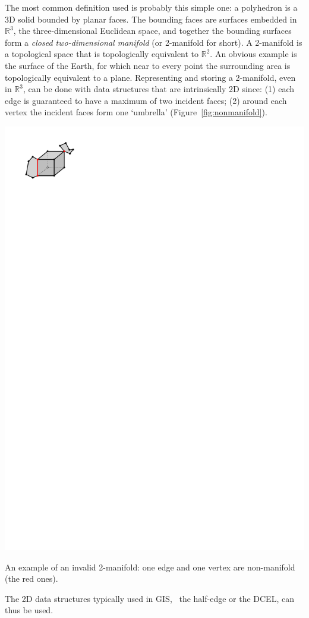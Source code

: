 %

The most common definition used is probably this simple one: a polyhedron is a 3D solid bounded by planar faces. 
The bounding faces are surfaces embedded in $\mathbb{R}^3$, the three-dimen\-si\-o\-nal Euclidean space, and together the bounding surfaces form a \emph{closed two-dimensional manifold} (or 2-manifold for short).
A 2-manifold is a topological space that is topologically equivalent to $\mathbb{R}^2$. 
An obvious example is the surface of the Earth, for which near to every point the surrounding area is topologically equivalent to a plane. 
Representing and storing a 2-manifold, even in $\mathbb{R}^3$, can be done with data structures that are intrinsically 2D since: (1) each edge is guaranteed to have a maximum of two incident faces; (2) around each vertex the incident faces form one `umbrella' (Figure~\ref{fig:nonmanifold}).
\begin{marginfigure}
  \centering
  \includegraphics[width=0.9\linewidth]{figs/nonmanifold}
  \caption{An example of an invalid 2-manifold: one edge and one vertex are non-manifold (the red ones).}%
\label{fig:nonmanifold}
\end{marginfigure}
The 2D data structures typically used in GIS, \eg\ the half-edge or the DCEL, can thus be used.




